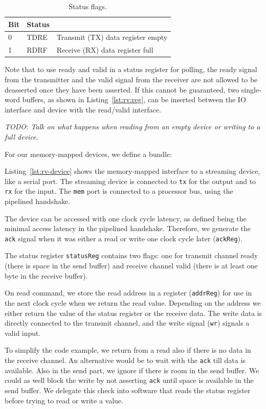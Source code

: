 \documentclass[%
    10pt,
    headinclude, footinclude=false,
    openright, %
    notitlepage,
    cleardoublepage=empty,
    headsepline,
    numbers=noenddot,
    bibliography=totoc, index=totoc,
    ]{scrbook}
\newcommand{\code}[1]{{\lstinline[basicstyle=\small\ttfamily]{#1}}}
\newcommand{\todo}[1]{{\emph{TODO: #1}}}
\begin{document}
\begin{table}
\centering
\begin{tabular}{lll}
\toprule
Bit & Status & \\
\midrule
0 & TDRE & Transmit (TX) data register empty \\
1 & RDRF & Receive (RX) data register full \\
\bottomrule
\end{tabular}
\caption{Status flags.}
\label{tab:addr:uart:status}
\end{table}

Note that to use ready and valid in a status register for polling, the ready signal from
the transmitter and the valid signal from the receiver are not allowed to be deasserted
once they have been asserted. If this cannot be guaranteed, two single-word buffers,
as shown in Listing~\ref{lst:rv:reg}, can be inserted between the IO interface and
device with the read/valid interface.

\todo{Talk on what happens when reading from an empty device or writing to a full device.}

For our memory-mapped devices, we define a bundle:


Listing~\ref{lst:rv-device} shows the memory-mapped interface to a streaming
device, like a serial port. The streaming device is connected to \code{tx} for the output
and to \code{rx} for the input. The \code{mem} port is connected to a processor bus,
using the pipelined handshake.

The device can be accessed with one clock cycle latency, as defined being the minimal
access latency in the pipelined handshake. Therefore, we generate the \code{ack}
signal when it was either a read or write one clock cycle later (\code{ackReg}).

The status register \code{statusReg} contains two flags: one for transmit channel ready
(there is space in the send buffer) and receive channel valid (there is at least one byte
in the receive buffer).

On read command, we store the read address in a register (\code{addrReg})
for use in the next clock cycle when we return the read value. Depending on the address
we either return the value of the status register or the receive data.
The write data is directly connected to the transmit channel, and the write signal
(\code{wr}) signals a valid input.


To simplify the code example, we return from a read also if there is no data in the
receive channel. An alternative would be to wait with the \code{ack} till
data is available. Also in the send part, we ignore if there is room in the
send buffer. We could as well block the write by not asserting \code{ack}
until space is available in the send buffer.
We delegate this check into software that reads the status register before trying
to read or write a value.
\end{document}
